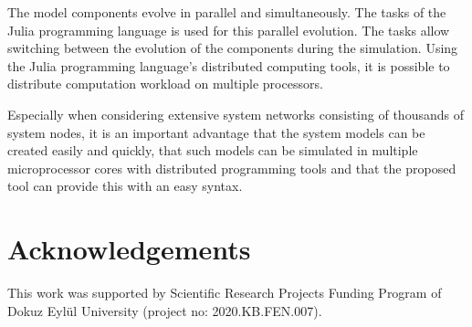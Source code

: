 \documentclass{juliacon}
\begin{document}
The model components evolve in parallel and simultaneously. The tasks of the Julia programming language is used for this parallel evolution. The tasks allow switching between the evolution of the components during the simulation. Using the Julia programming language's distributed computing tools, it is possible to distribute computation workload on multiple processors.

Especially when considering extensive system networks consisting of thousands of system nodes, it is an important advantage that the system models can be created easily and quickly, that such models can be simulated in multiple microprocessor cores with distributed programming tools and that the proposed tool can provide this with an easy syntax.

\section{Acknowledgements}
This work was supported by Scientific Research Projects Funding Program of Dokuz Eylül University (project no: 2020.KB.FEN.007).



\onecolumn
\appendix 
\end{document}
